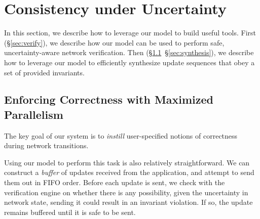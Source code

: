 
\section{Consistency under Uncertainty}

In this section, we describe how to leverage our model to build useful tools.
First (\S\ref{sec:verify}), we describe how our model can be used to perform
safe, uncertainty-aware network verification.
Then (\S\ref{sec:parallelism}~\S\ref{sec:synthesis}), we describe how to 
leverage our model to efficiently synthesize update sequences
that obey a set of provided invariants.
\fi
{}


\subsection{Enforcing Correctness with Maximized Parallelism}
\label{sec:parallelism}

The key goal of our system is to {\em instill}
user-specified notions of correctness during network transitions.

Using our model to perform this task is also relatively straightforward.
We can construct a {\em buffer} of updates received from the application,
and attempt to send them out in FIFO order. Before each update is sent, we check with the
verification engine on whether there is any possibility, given the uncertainty in network state, sending it could result in an invariant violation. If so, the update remains buffered until it is safe to be sent.

